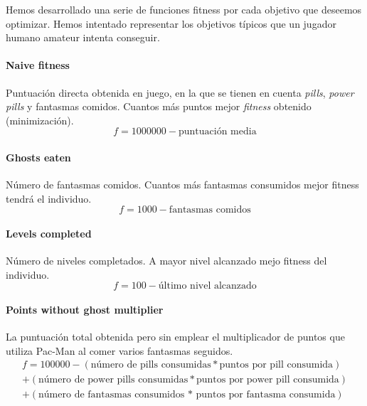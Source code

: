Hemos desarrollado una serie de funciones fitness por cada objetivo que deseemos optimizar. Hemos intentado representar los objetivos típicos que un jugador humano amateur intenta conseguir.

\paragraph{Naive fitness}
Puntuación directa obtenida en juego, en la que se tienen en cuenta \textit{pills}, \textit{power pills} y fantasmas comidos. Cuantos más puntos mejor \textit{fitness} obtenido (minimización).
\begin{equation*}
f = 1000000 - \textrm{puntuación media}
\end{equation*}

\paragraph{Ghosts eaten}
Número de fantasmas comidos. Cuantos más fantasmas consumidos mejor fitness tendrá el individuo.
\begin{equation*}
f = 1000 - \textrm{fantasmas comidos}
\end{equation*}

\paragraph{Levels completed}
Número de niveles completados. A mayor nivel alcanzado mejo fitness del individuo.
\begin{equation*}
f = 100 - \textrm{último nivel alcanzado}
\end{equation*}

\paragraph{Points without ghost multiplier}
La puntuación total obtenida pero sin emplear el multiplicador de puntos que utiliza Pac-Man al comer varios fantasmas seguidos.
\begin{equation*}
\begin{split}
f = 100000 - (\textrm{número de pills consumidas} * \textrm{puntos por pill consumida}) \\
+ (\textrm{número de power pills consumidas} * \textrm{puntos por power pill consumida}) \\
+ (\textrm{número de fantasmas consumidos * puntos por fantasma consumida})
\end{split}
\end{equation*}

